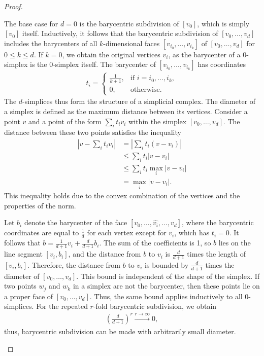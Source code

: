 \begin{proof}
\begin{enumerate}
	The base case for $d=0$ is the barycentric subdivision of $[v_0]$, which is simply $[v_0]$ itself. Inductively, it follows that the barycentric subdivision of $[v_0, \ldots, v_d]$ includes the barycenters of all $k$-dimensional faces $[v_{i_0}, \ldots, v_{i_k}]$ of $[v_0, \ldots, v_d]$ for $0 \leq k \leq d$. If $k=0$, we obtain the original vertices $v_i$, as the barycenter of a $0$-simplex is the $0$-simplex itself. The barycenter of $[v_{i_0}, \ldots, v_{i_k}]$ has coordinates
	\begin{align}
		t_i = \begin{cases}
		\frac{1}{k+1}, & \text{if } i = i_0, \ldots, i_k, \\
		0,             & \text{otherwise}.                
		\end{cases}
	\end{align}
	The \(d\)-simplices thus form the structure of a simplicial complex. The diameter of a simplex is defined as the maximum distance between its vertices. Consider a point \(v\) and a point of the form \(\sum_i t_i v_i\) within the simplex \([v_0, \ldots, v_d]\). The distance between these two points satisfies the inequality
	\begin{align}
		\left\lvert v - \sum_i t_i v_i \right\rvert & = \left\lvert \sum_i t_i(v - v_i) \right\rvert \nonumber\\
		                                            & \leq \sum_i t_i \left\lvert v - v_i \right\rvert \nonumber\\
		                                            & \leq \sum_i t_i \max_i \left\lvert v - v_i \right\rvert \nonumber\\
		                                            & = \max_i \left\lvert v - v_i \right\rvert.              
	\end{align}
	This inequality holds due to the convex combination of the vertices and the properties of the norm.
			
	Let \(b_i\) denote the barycenter of the face \([v_0, \ldots, \hat{v_i}, \ldots, v_d]\), where the barycentric coordinates are equal to \(\frac{1}{d}\) for each vertex except for \(v_i\), which has \(t_i = 0\). It follows that \(b = \frac{1}{d+1} v_i + \frac{d}{d+1} b_i\). The sum of the coefficients is 1, so \(b\) lies on the line segment \([v_i, b_i]\), and the distance from \(b\) to \(v_i\) is \(\frac{d}{d+1}\) times the length of \([v_i, b_i]\). Therefore, the distance from \(b\) to \(v_i\) is bounded by \(\frac{d}{d+1}\) times the diameter of \([v_0, \ldots, v_d]\). This bound is independent of the shape of the simplex. If two points \(w_j\) and \(w_k\) in a simplex are not the barycenter, then these points lie on a proper face of \([v_0, \ldots, v_d]\). Thus, the same bound applies inductively to all \(0\)-simplices. For the repeated \(r\)-fold barycentric subdivision, we obtain
	\begin{align}
		\left(\frac{d}{d+1}\right)^r \xrightarrow[]{r \rightarrow \infty} 0, 
	\end{align}
	thus, barycentric subdivision can be made with arbitrarily small diameter.
			

\end{enumerate}
\end{proof}

